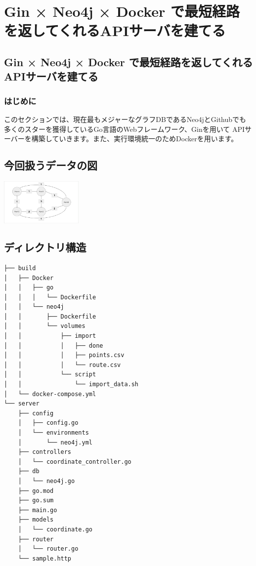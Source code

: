 \chapter{Gin × Neo4j × Docker で最短経路を返してくれるAPIサーバを建てる}

\section{Gin × Neo4j × Docker で最短経路を返してくれるAPIサーバを建てる}
\subsection{はじめに}
このセクションでは、現在最もメジャーなグラフDBであるNeo4jとGithubでも多くのスターを獲得しているGo言語のWebフレームワーク、Ginを用いて
APIサーバーを構築していきます。また、実行環境統一のためDockerを用います。

\section{今回扱うデータの図}
\includegraphics[width=4cm]{./image/03-Tech/chap3/sample_node.png}

\section{ディレクトリ構造}
\begin{tcolorbox}[breakable]
    \begin{verbatim}
├── build
│   ├── Docker
│   │   ├── go
│   │   │   └── Dockerfile
│   │   └── neo4j
│   │       ├── Dockerfile
│   │       └── volumes
│   │           ├── import
│   │           │   ├── done
│   │           │   ├── points.csv
│   │           │   └── route.csv
│   │           └── script
│   │               └── import_data.sh
│   └── docker-compose.yml
└── server
    ├── config
    │   ├── config.go
    │   └── environments
    │       └── neo4j.yml
    ├── controllers
    │   └── coordinate_controller.go
    ├── db
    │   └── neo4j.go
    ├── go.mod
    ├── go.sum
    ├── main.go
    ├── models
    │   └── coordinate.go
    ├── router
    │   └── router.go
    └── sample.http
\end{verbatim}
\end{tcolorbox}

